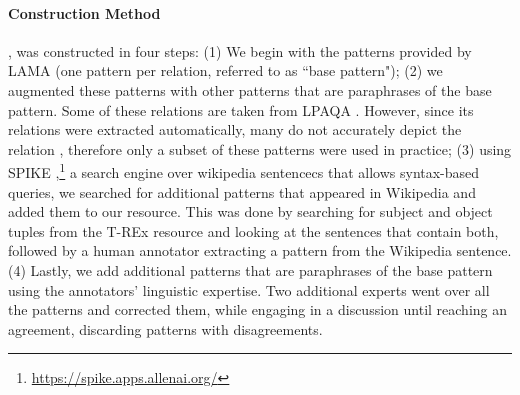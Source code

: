 
\paragraph{Construction Method}
\resource{}, was constructed in four steps: (1) We begin 
with the patterns provided by LAMA \cite{lama} (one pattern per relation, referred to as ``base pattern"); (2) we augmented these patterns with other patterns that are paraphrases of the base pattern. Some of these relations are
taken from LPAQA \cite{alpaqa}. However, since its relations were extracted automatically, many do not accurately depict the relation , therefore only a subset of these patterns were used in practice;  (3) using SPIKE \cite{spike},\footnote{\url{https://spike.apps.allenai.org/}} a search engine over wikipedia sentencecs that allows syntax-based queries, we searched for additional patterns that appeared in Wikipedia and added them to our resource. This was done by searching for subject and object tuples from the T-REx resource and
looking at the sentences that contain both, followed by a human annotator extracting a pattern from the Wikipedia sentence. (4) Lastly, we add  additional patterns that are paraphrases of the base pattern using the annotators' linguistic expertise.
Two additional experts went over all the patterns and corrected them, while engaging in a discussion until reaching an agreement, discarding patterns with disagreements.


